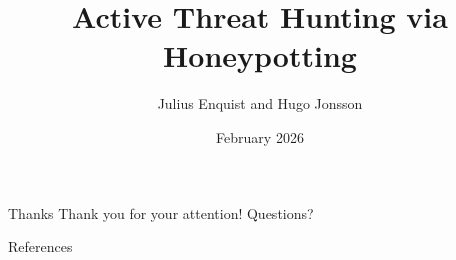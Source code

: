 \documentclass{beamer}
\title{Active Threat Hunting via Honeypotting}
\author{Julius Enquist and Hugo Jonsson}
\date{February 2026}
\begin{document}
\begin{frame}
\titlepage
\end{frame}

\begin{frame}{Thanks}
    \centering
    Thank you for your attention!
    Questions?
\end{frame}

\begin{frame}{References}
\nocite{*}
    \printbibliography
\end{frame}
\end{document}
